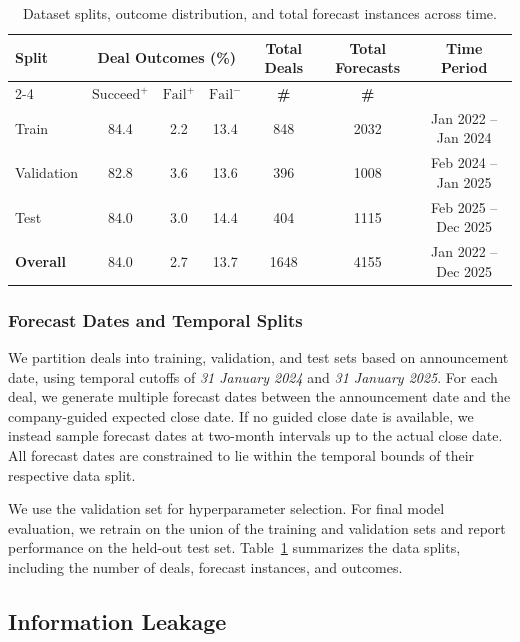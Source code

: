 \documentclass{article}
\theoremstyle{plain}
\theoremstyle{definition}
\theoremstyle{remark}
\newcommand{\SucceedPlus}{\boldsymbol{\mathrm{Succeed}^{+}}}
\newcommand{\FailPlus}{\boldsymbol{\mathrm{Fail}^{+}}}
\newcommand{\FailMinus}{\boldsymbol{\mathrm{Fail}^{-}}}
\begin{document}
\begin{table}[t]
\caption{Dataset splits, outcome distribution, and total forecast instances across time.}
\label{tab:dataset-splits}
\centering
\small
\begin{tabularx}{\textwidth}{@{}X*{3}{c}*{2}{c}c@{}}
\toprule
\textbf{Split} & \multicolumn{3}{c}{\textbf{Deal Outcomes (\%)}}
& \multicolumn{1}{c}{\textbf{Total Deals}}
& \multicolumn{1}{c}{\textbf{Total Forecasts}}
& \textbf{Time Period} \\
\cmidrule(lr){2-4}
& $\SucceedPlus$ & $\FailPlus$ & $\FailMinus$
& \textbf{\#}
& \textbf{\#}
& \\
\midrule
Train      & 84.4 & 2.2 & 13.4 & 848 & 2032 & Jan 2022 -- Jan 2024 \\
Validation & 82.8 & 3.6 & 13.6 & 396 & 1008 & Feb 2024 -- Jan 2025 \\
Test       & 84.0 & 3.0 & 14.4 & 404 & 1115 & Feb 2025 -- Dec 2025 \\
\midrule
\textbf{Overall} & 84.0 & 2.7 & 13.7 & 1648 & 4155 & Jan 2022 -- Dec 2025 \\
\bottomrule
\end{tabularx}
\end{table}

\subsubsection{Forecast Dates and Temporal Splits}

We partition deals into training, validation, and test sets based on announcement date, using temporal cutoffs of \emph{31 January 2024} and \emph{31 January 2025}. For each deal, we generate multiple forecast dates between the announcement date and the company-guided expected close date. If no guided close date is available, we instead sample forecast dates at two-month intervals up to the actual close date. All forecast dates are constrained to lie within the temporal bounds of their respective data split.

We use the validation set for hyperparameter selection. For final model evaluation, we retrain on the union of the training and validation sets and report performance on the held-out test set. Table~\ref{tab:dataset-splits} summarizes the data splits, including the number of deals, forecast instances, and outcomes.

\subsection{Information Leakage}
\label{sec:leakage}
\end{document}
